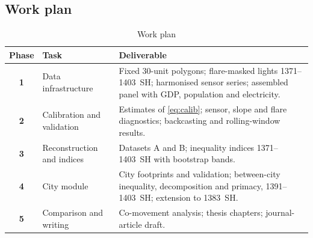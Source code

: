 \documentclass[11pt,a4paper]{article}
\begin{document}
\subsection{Work plan}

\begin{table}[htbp]
\centering\small
\caption{Work plan}
\label{tab:plan}
\begin{tabularx}{\textwidth}{@{}c>{\raggedright\arraybackslash}p{3.7cm}>{\raggedright\arraybackslash}X@{}}
\toprule
\textbf{Phase} & \textbf{Task} & \textbf{Deliverable}\\
\midrule
\textsf{\textbf{\color{navy}1}} & Data infrastructure & Fixed 30-unit polygons; flare-masked lights 1371--1403~SH; harmonised sensor series; assembled panel with GDP, population and electricity.\\
\textsf{\textbf{\color{navy}2}} & Calibration and validation & Estimates of \eqref{eq:calib}; sensor, slope and flare diagnostics; backcasting and rolling-window results.\\
\textsf{\textbf{\color{navy}3}} & Reconstruction and indices & Datasets A and B; inequality indices 1371--1403~SH with bootstrap bands.\\
\textsf{\textbf{\color{navy}4}} & City module & City footprints and validation; between-city inequality, decomposition and primacy, 1391--1403~SH; extension to 1383~SH.\\
\textsf{\textbf{\color{navy}5}} & Comparison and writing & Co-movement analysis; thesis chapters; journal-article draft.\\
\bottomrule
\end{tabularx}
\end{table}
\end{document}

